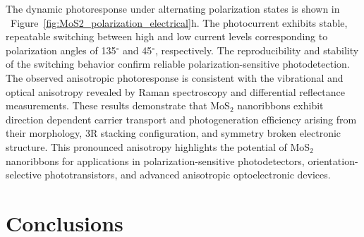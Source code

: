 \documentclass[journal=jacsnano,manuscript=article]{achemso}
\begin{document}
The dynamic photoresponse under alternating polarization states is shown in ~Figure~\ref{fig:MoS2_polarization_electrical}h. The photocurrent exhibits stable, repeatable switching between high and low current levels corresponding to polarization angles of 135$^\circ$ and 45$^\circ$, respectively. The reproducibility and stability of the switching behavior confirm reliable polarization-sensitive photodetection. The observed anisotropic photoresponse is consistent with the vibrational and optical anisotropy revealed by Raman spectroscopy and differential reflectance measurements. These results demonstrate that MoS$_2$ nanoribbons exhibit direction dependent carrier transport and photogeneration efficiency arising from their  morphology, 3R stacking configuration, and symmetry broken electronic structure. This pronounced anisotropy highlights the potential of MoS$_2$ nanoribbons for applications in polarization-sensitive photodetectors, orientation-selective phototransistors, and advanced anisotropic optoelectronic devices.



\section{Conclusions}
\end{document}
